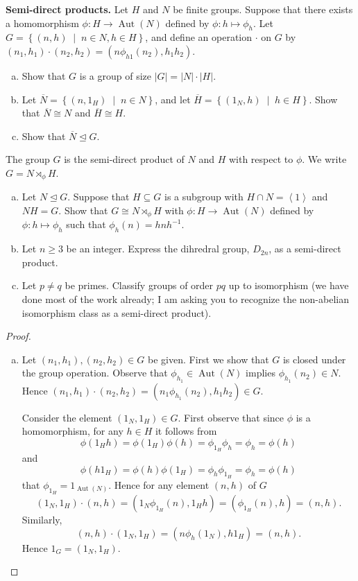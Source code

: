 \documentclass[10pt]{amsart}
\newcommand{\Aut}[1]{\operatorname{Aut}\left(#1\right)}
\newcommand{\abs}[1]{\left| #1 \right|}
\begin{document}
\begin{thm}
  {\bf Semi-direct products.}
  Let $H$ and $N$ be finite groups.
  Suppose that there exists a homomorphism $\phi \colon H \rightarrow \Aut{N}$ defined by $\phi \colon h \mapsto \phi_h$.
  Let $G = \left\{ (n,h) \;\middle\vert\; n \in N, h \in H \right\}$, and define an operation $\cdot$ on $G$ by $(n_1,h_1)\cdot(n_2,h_2) = (n\phi_{h1}(n_2), h_1h_2)$.
  \begin{enumerate}[(a)]
  \item
    Show that $G$ is a group of size $\abs{G} = \abs{N}\cdot\abs{H}$.
  \item
    Let $\overline{N} = \left\{(n, 1_H) \;\middle\vert\; n \in N \right\}$, and let $\overline{H} = \left\{(1_N, h) \;\middle\vert\; h \in H \right\}$.
    Show that $\overline{N} \cong N$ and $\overline{H} \cong H$.
  \item
    Show that $\overline{N} \unlhd G$.
    \setcounter{saveenum}{\value{enumi}}
  \end{enumerate}
  The group $G$ is the semi-direct product of $N$ and $H$ with respect to $\phi$.
  We write $G = N \rtimes_{\phi} H$.
  \begin{enumerate}[(a)]
    \setcounter{enumi}{\value{saveenum}}
  \item
    Let $N \unlhd G$.
    Suppose that $H \subseteq G$ is a subgroup with $H \cap N = \left< 1 \right>$ and $NH = G$.
    Show that $G \cong N \rtimes_{\phi} H$ with $\phi \colon H \rightarrow \Aut{N}$ defined by $\phi \colon h \mapsto \phi_h$ such that $\phi_h(n) = hnh^{-1}$.
  \item
    Let $n \geq 3$ be an integer.
    Express the dihredral group, $D_{2n}$, as a semi-direct product.
  \item
    Let $p \not = q$ be primes.
    Classify groups of order $pq$ up to isomorphism (we have done most of the work already; I am asking you to recognize the non-abelian isomorphism class as a semi-direct product).
  \end{enumerate}
  \begin{proof}
    \begin{enumerate}[(a)]
    \item
      Let $(n_1, h_1), (n_2, h_2) \in G$ be given.
      First we show that $G$ is closed under the group operation.
      Observe that $\phi_{h_1} \in \Aut{N}$ implies $\phi_{h_1}(n_2) \in N$.
      Hence $(n_1,h_1)\cdot (n_2, h_2) = (n_1\phi_{h_1}(n_2), h_1h_2) \in G$.
      
      Consider the element $(1_N, 1_H) \in G$.
      First observe that since $\phi$ is a homomorphism, for any $h \in H$ it follows from 
      $$\phi(1_Hh) = \phi(1_H)\phi(h) = \phi_{1_H}\phi_h = \phi_h = \phi(h)$$
      and
      $$\phi(h1_H) = \phi(h)\phi(1_H) = \phi_h\phi_{1_H} = \phi_h = \phi(h)$$
      that $\phi_{1_H} = 1_{\Aut{N}}$.
      Hence for any element $(n,h)$ of $G$
      $$(1_N,1_H) \cdot (n,h) = (1_N \phi_{1_H}(n), 1_Hh) = (\phi_{1_H}(n), h) = (n, h).$$
      Similarly, 
      $$(n,h) \cdot (1_N,1_H) = (n \phi_{h}(1_N), h1_H) = (n, h).$$
      Hence $1_G = (1_N, 1_H)$.
      

\end{enumerate}
\end{proof}
\end{thm}
\end{document}

